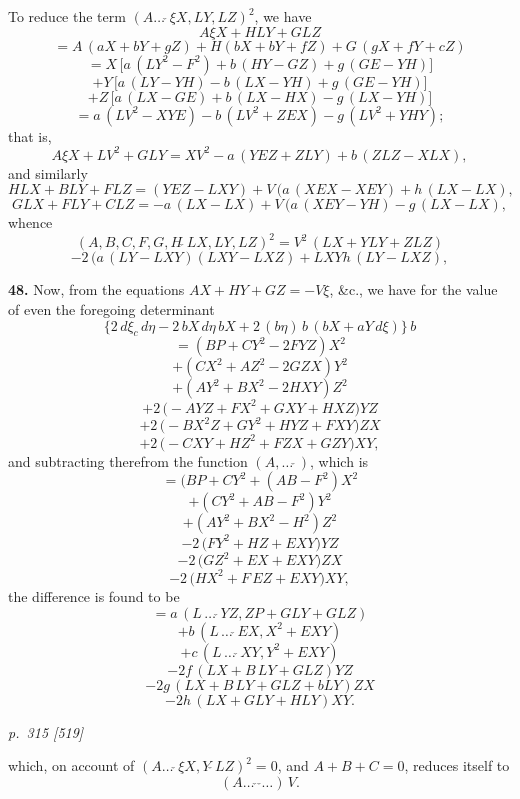 \documentclass[11pt,a4paper]{book}
\begin{document}
To reduce the term $(A\ldots\,\check{}\,\xi X, LY, LZ)^2$, we have
\[
A\xi X + H L Y + G L Z
\]
\[
= A\,(aX + b Y + g Z) + H(bX + b Y + f Z) + G\,(gX + fY + cZ)
\]
\[
= X\,\bigl[a\,(LY^2 - F^2) + b\,(HY - GZ) + g\,(GE - YH)\bigr]
\]
\[
+ Y\,\bigl[a\,(LY - YH) - b\,(LX - YH) + g\,(GE - YH)\bigr]
\]
\[
+ Z\,\bigl[a\,(LX - GE) + b\,(LX - HX) - g\,(LX - YH)\bigr]
\]
\[
= a\,(LV^2 - XYE) - b\,(LV^2 + ZEX) - g\,(LV^2 + YHY);
\]
that is,
\[
A\xi X + LV^2 + GLY = XV^2 - a\,(YEZ + ZLY) + b\,(ZLZ - XLX),
\]
and similarly
\[
HLX + BLY + FLZ = (Y EZ - LXY) + V\,(a\,(XEX - XEY) + h\,(LX - LX),
\]
\[
GLX + FLY + CLZ = -a\,(LX - LX) + V\,(a\,(XEY - YH) - g\,(LX - LX),
\]
whence
\[
(A, B, C, F, G, H\,\check{}\,LX, LY, LZ)^2 = V^2\,(LX + YLY + ZLZ)
\]
\[
- 2\,(a\,(LY - LXY)(LXY - LXZ) + LXY h\,(LY - LXZ),
\]

\textbf{48.} Now, from the equations $AX + HY + GZ = -V\xi$, \&c., we have for the value of even the foregoing determinant
\[
\bigl\{2\,d\xi_{c}\,d\eta - 2\,b X\,d\eta\,b X + 2\,(b\eta)\,b\,(b X + a Y\,d\xi)\bigr\}\,b
\]
\[
= (BP + CY^2 - 2FYZ)X^2
\]
\[
+ (CX^2 + AZ^2 - 2GZX)Y^2
\]
\[
+ (AY^2 + BX^2 - 2HXY)Z^2
\]
\[
+ 2\,\bigl(-AYZ + F X^2 + GXY + HXZ\bigr)YZ
\]
\[
+ 2\,\bigl(-BX^2Z + GY^2 + HYZ + FXY\bigr)ZX
\]
\[
+ 2\,\bigl(-CXY + HZ^2 + FZX + GZY\bigr)XY,
\]
and subtracting therefrom the function $(A, \ldots\,\check{}\,)$, which is
\[
= (BP + CY^2 + (AB - F^2)X^2
\]
\[
+ (CY^2 + AB - F^2)Y^2
\]
\[
+ (AY^2 + BX^2 - H^2)Z^2
\]
\[
- 2\,\bigl(FY^2 + HZ + EXY\bigr)YZ
\]
\[
- 2\,\bigl(GZ^2 + EX + EXY\bigr)ZX
\]
\[
- 2\,\bigl(HX^2 + F\,EZ + EXY\bigr)XY,
\]
the difference is found to be
\[
= a\,(L\,\ldots\,\check{}\,YZ, ZP + GLY + GLZ)
\]
\[
+ b\,(L\,\ldots\,\check{}\,EX, X^2 + EXY)
\]
\[
+ c\,(L\,\ldots\,\check{}\,XY, Y^2 + EXY)
\]
\[
- 2f\,(LX + B\,LY + GLZ)YZ
\]
\[
- 2g\,(LX + B\,LY + GLZ + b LY)ZX
\]
\[
- 2h\,(LX + GLY + HLY)XY.
\]

\clearpage

\bigskip
\textit{p.~315 [519]}
\smallskip

\noindent
which, on account of $(A\ldots\,\check{}\,\xi X, Y\,\check{}\,LZ)^2 = 0$, and $A + B + C = 0$, reduces itself to
\[
(A\ldots\,\check{}\,\,\check{}\ldots)\,V.
\]
\end{document}

